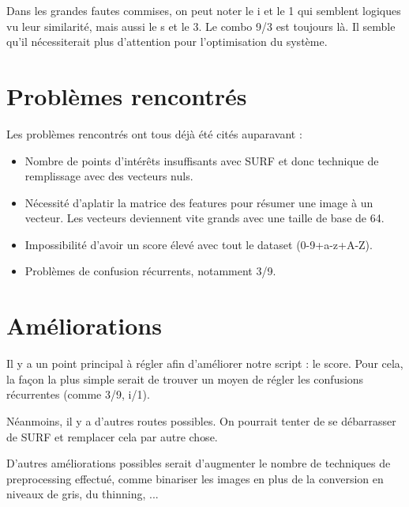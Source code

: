 Dans les grandes fautes commises, on peut noter le i et le 1 qui semblent logiques vu leur similarité, mais aussi le s et le 3. Le combo 9/3 est toujours là. Il semble qu'il nécessiterait plus d'attention pour l'optimisation du système.

\section{Problèmes rencontrés}

Les problèmes rencontrés ont tous déjà été cités auparavant :

\begin{itemize}
\item Nombre de points d'intérêts insuffisants avec SURF et donc technique de remplissage avec des vecteurs nuls.
\item Nécessité d'aplatir la matrice des features pour résumer une image à un vecteur. Les vecteurs deviennent vite grands avec une taille de base de 64.
\item Impossibilité d'avoir un score élevé avec tout le dataset (0-9+a-z+A-Z).
\item Problèmes de confusion récurrents, notamment 3/9.
\end{itemize}

\section{Améliorations}

Il y a un point principal à régler afin d'améliorer notre script : le score. Pour cela, la façon la plus simple serait de trouver un moyen de régler les confusions récurrentes (comme 3/9, i/1).

Néanmoins, il y a d'autres routes possibles. On pourrait tenter de se débarrasser de SURF et remplacer cela par autre chose. 

D'autres améliorations possibles serait d'augmenter le nombre de techniques de preprocessing effectué, comme binariser les images en plus de la conversion en niveaux de gris, du thinning, ...